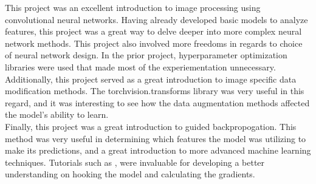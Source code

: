 \documentclass{article}[12pt]
\begin{document}
This project was an excellent introduction to image processing using convolutional neural networks. Having already developed basic models to analyze features, this project was a great way to delve deeper into more complex neural network methods. This project also involved more freedoms in regards to choice of neural network design. In the prior project, hyperparameter optimization libraries were used that made most of the experiementation unnecessary.\\
\indent
Additionally, this project served as a great introduction to image specific data modification methods. The torchvision.transforms library was very useful in this regard, and it was interesting to see how the data augmentation methods affected the model's ability to learn.\\
\indent
Finally, this project was a great introduction to guided backpropogation. This method was very useful in determining which features the model was utilizing to make its predictions, and a great introduction to more advanced machine learning techniques. Tutorials such as \cite{saliency}, \cite{backprop} were invaluable for developing a better understanding on hooking the model and calculating the gradients.\\



\end{document}
